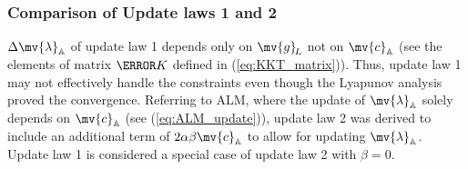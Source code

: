 \documentclass[journal]{IEEEtranTIE}
\begin{document}
\subsubsection{Comparison of Update laws 1 and 2}
${\Delta \mv{\lambda}_{\mathbb{A}}}$ of update law 1 depends only on ${\mv{g}_{\!L}}$ not on ${\mv{c}_{\mathbb{A}}}$ (see the elements of matrix $\mm{K}$ defined in (\ref{eq:KKT_matrix})). Thus, update law 1 may not effectively handle the constraints even though the Lyapunov analysis proved the convergence. Referring to ALM, where the update of $\mv{\lambda}_{\mathbb{A}}$ solely depends on ${\mv{c}_{\mathbb{A}}}$ (see (\ref{eq:ALM_update})), update law 2 was derived to include an additional term of $2\alpha\beta{\mv{c}_{\mathbb{A}}}$ to allow for updating $\mv{\lambda}_{\mathbb{A}}$. Update law 1 is considered a special case of update law 2 with $\beta = 0$. 
\end{document}
